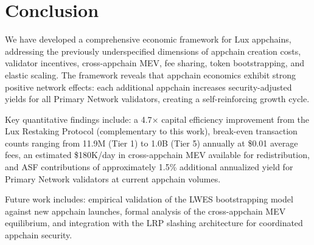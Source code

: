 \section{Conclusion}


We have developed a comprehensive economic framework for Lux appchains, addressing the
previously underspecified dimensions of appchain creation costs, validator incentives,
cross-appchain MEV, fee sharing, token bootstrapping, and elastic scaling. The framework
reveals that appchain economics exhibit strong positive network effects: each additional
appchain increases security-adjusted yields for all Primary Network validators, creating
a self-reinforcing growth cycle.

Key quantitative findings include: a 4.7$\times$ capital efficiency improvement from the
Lux Restaking Protocol (complementary to this work), break-even transaction counts ranging
from 11.9M (Tier 1) to 1.0B (Tier 5) annually at \$0.01 average fees, an estimated
\$180K/day in cross-appchain MEV available for redistribution, and ASF contributions of
approximately 1.5\% additional annualized yield for Primary Network validators at current
appchain volumes.

Future work includes: empirical validation of the LWES bootstrapping model against new
appchain launches, formal analysis of the cross-appchain MEV equilibrium, and integration
with the LRP slashing architecture for coordinated appchain security.

